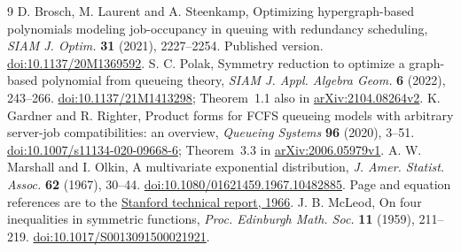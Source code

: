 \documentclass[11pt]{article}
\begin{document}
\begin{thebibliography}{9}
 D. Brosch, M. Laurent and A. Steenkamp,
Optimizing hypergraph-based polynomials modeling job-occupancy in queuing
with redundancy scheduling, \emph{SIAM J. Optim.} \textbf{31} (2021),
2227--2254. Published version.
\href{https://doi.org/10.1137/20M1369592}{doi:10.1137/20M1369592}.
 S. C. Polak,
Symmetry reduction to optimize a graph-based polynomial from queueing
theory, \emph{SIAM J. Appl. Algebra Geom.} \textbf{6} (2022), 243--266.
\href{https://doi.org/10.1137/21M1413298}{doi:10.1137/21M1413298};
Theorem~1.1 also in \href{https://arxiv.org/abs/2104.08264v2}{arXiv:2104.08264v2}.
 K. Gardner and R. Righter,
Product forms for FCFS queueing models with arbitrary server-job
compatibilities: an overview, \emph{Queueing Systems} \textbf{96}
(2020), 3--51.
\href{https://doi.org/10.1007/s11134-020-09668-6}{doi:10.1007/s11134-020-09668-6};
Theorem~3.3 in \href{https://arxiv.org/abs/2006.05979v1}{arXiv:2006.05979v1}.
 A. W. Marshall and I. Olkin,
A multivariate exponential distribution, \emph{J. Amer. Statist. Assoc.}
\textbf{62} (1967), 30--44.
\href{https://doi.org/10.1080/01621459.1967.10482885}{doi:10.1080/01621459.1967.10482885}.
Page and equation references are to the
\href{https://purl.stanford.edu/kb905zm7154}{Stanford technical report, 1966}.
 J. B. McLeod,
On four inequalities in symmetric functions,
\emph{Proc. Edinburgh Math. Soc.} \textbf{11} (1959), 211--219.
\href{https://doi.org/10.1017/S0013091500021921}{doi:10.1017/S0013091500021921}.
\end{thebibliography}
\end{document}
